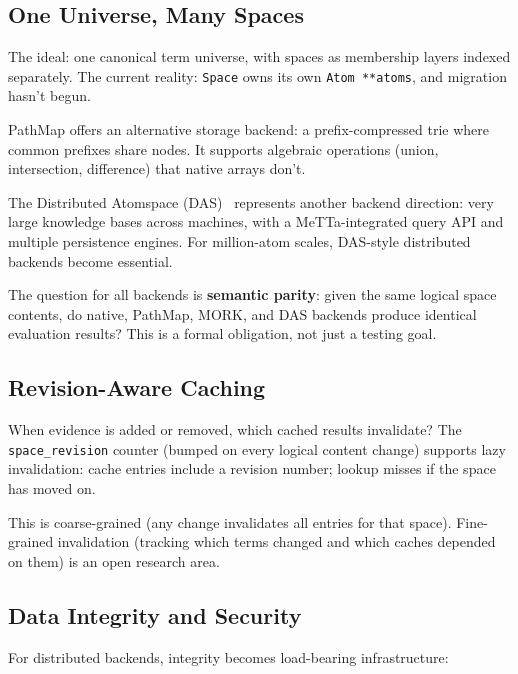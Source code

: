 \documentclass[11pt]{article}
\newcommand{\code}[1]{\texttt{#1}}
\newcommand{\PathMap}{\textup{PathMap}}
\newcommand{\MORK}{\textup{MORK}}
\begin{document}
\subsection{One Universe, Many Spaces}

The ideal: one canonical term universe, with spaces as membership layers
indexed separately.  The current reality: \code{Space} owns its own
\code{Atom **atoms}, and migration hasn't begun.

\PathMap{} offers an alternative storage backend: a prefix-compressed
trie where common prefixes share nodes.  It supports algebraic operations
(union, intersection, difference) that native arrays don't.

The Distributed Atomspace (DAS)~\cite{DAS} represents another backend
direction: very large knowledge bases across machines, with a MeTTa-integrated
query API and multiple persistence engines.  For million-atom scales,
DAS-style distributed backends become essential.

The question for all backends is \textbf{semantic parity}: given the same
logical space contents, do native, \PathMap{}, \MORK{}, and DAS backends
produce identical evaluation results?  This is a formal obligation, not
just a testing goal.

\subsection{Revision-Aware Caching}

When evidence is added or removed, which cached results invalidate?
The \code{space\_revision} counter (bumped on every logical content change)
supports lazy invalidation: cache entries include a revision number;
lookup misses if the space has moved on.

This is coarse-grained (any change invalidates all entries for that space).
Fine-grained invalidation (tracking which terms changed and which caches
depended on them) is an open research area.

\subsection{Data Integrity and Security}

For distributed backends, integrity becomes load-bearing infrastructure:
\end{document}
